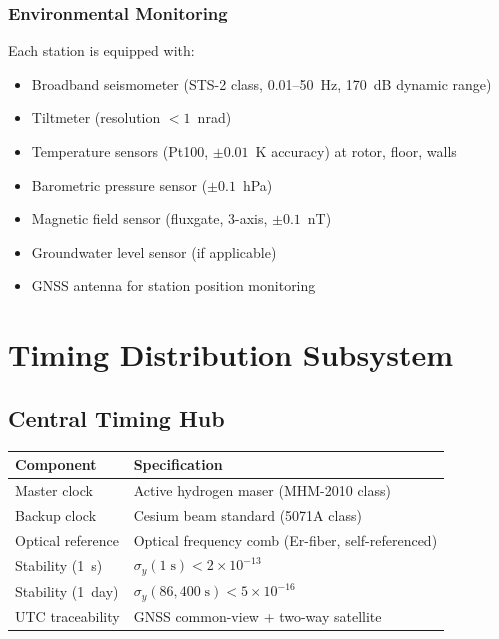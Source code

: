 \documentclass[11pt,a4paper]{article}
\begin{document}
\subsubsection{Environmental Monitoring}

Each station is equipped with:
\begin{itemize}
\item Broadband seismometer (STS-2 class, 0.01--50~Hz, 170~dB dynamic range)
\item Tiltmeter (resolution $< 1$~nrad)
\item Temperature sensors (Pt100, $\pm 0.01$~K accuracy) at rotor, floor, walls
\item Barometric pressure sensor ($\pm 0.1$~hPa)
\item Magnetic field sensor (fluxgate, 3-axis, $\pm 0.1$~nT)
\item Groundwater level sensor (if applicable)
\item GNSS antenna for station position monitoring
\end{itemize}

\section{Timing Distribution Subsystem}

\subsection{Central Timing Hub}

\begin{longtable}{p{5cm}p{8cm}}
\toprule
\textbf{Component} & \textbf{Specification} \\
\midrule
\endfirsthead
Master clock & Active hydrogen maser (MHM-2010 class) \\
Backup clock & Cesium beam standard (5071A class) \\
Optical reference & Optical frequency comb (Er-fiber, self-referenced) \\
Stability (1~s) & $\sigma_y(1\;\text{s}) < 2\times10^{-13}$ \\
Stability (1~day) & $\sigma_y(86{,}400\;\text{s}) < 5\times10^{-16}$ \\
UTC traceability & GNSS common-view + two-way satellite \\
\bottomrule
\end{longtable}
\end{document}
